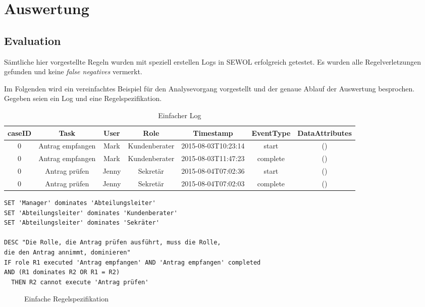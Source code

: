
\chapter{Auswertung} %

\label{Chapter5} %

\section{Evaluation}
Sämtliche hier vorgestellte Regeln wurden mit speziell erstellen Logs in SEWOL erfolgreich getestet. Es wurden alle Regelverletzungen gefunden und keine \textit{false negatives} vermerkt.

Im Folgenden wird ein vereinfachtes Beispiel für den Analysevorgang vorgestellt und der genaue Ablauf der Auswertung besprochen. Gegeben seien ein Log und eine Regelspezifikation.

\begin{table}[h!]
\footnotesize
\begin{tabular}{|c|c|c|c|c|c|c|}
\hline
caseID&Task&User&Role&Timestamp&EventType&DataAttributes\\
\hline
0&Antrag empfangen&Mark&Kundenberater&2015-08-03T10:23:14&start&()\\
0&Antrag empfangen&Mark&Kundenberater&2015-08-03T11:47:23&complete&()\\
0&Antrag prüfen&Jenny&Sekretär&2015-08-04T07:02:36&start&()\\
0&Antrag prüfen&Jenny&Sekretär&2015-08-04T07:02:03&complete&()\\
\hline
\end{tabular}
\caption{Einfacher Log}
\end{table}

\begin{verbatim}
SET 'Manager' dominates 'Abteilungsleiter'
SET 'Abteilungsleiter' dominates 'Kundenberater'
SET 'Abteilungsleiter' dominates 'Sekräter'

DESC "Die Rolle, die Antrag prüfen ausführt, muss die Rolle,
die den Antrag annimmt, dominieren"
IF role R1 executed 'Antrag empfangen' AND 'Antrag empfangen' completed
AND (R1 dominates R2 OR R1 = R2)
  THEN R2 cannot execute 'Antrag prüfen'
\end{verbatim}
\begin{figure}[h]
\caption{Einfache Regelspezifikation}
\end{figure}

